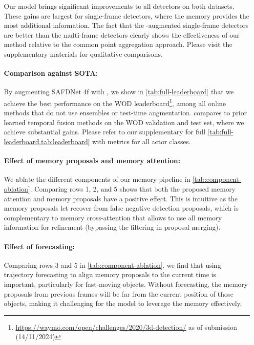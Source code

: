 Our model brings significant improvements to all detectors on both datasets.
These gains are largest for single-frame detectors, where the memory provides the most additional information.
The fact that the \ourmodel{}-augmented single-frame detectors are better than the multi-frame detectors clearly shows the effectiveness of our method relative to the common point aggregation approach.
Please visit the supplementary materials for qualitative comparisons.

\paragraph{Comparison against SOTA:}
By augmenting SAFDNet 4f with \ourmodel{},
we show in \cref{tab:full-leaderboard} that we achieve the best performance on the WOD leaderboard\footnote{\label{wod_leaderboard2}\href{https://waymo.com/open/challenges/2020/3d-detection/}{https://waymo.com/open/challenges/2020/3d-detection/} as of submission (14/11/2024)}, among all online methods that do not use ensembles or test-time augmentation.
 compares \ourmodel{}
to prior learned temporal fusion methods on
the WOD validation and test set, where we achieve substantial gains.
Please refer to our supplementary for full \cref{tab:full-leaderboard,tab:leaderboard} with metrics for all actor classes.


\paragraph{Effect of memory proposals and memory attention:}
We ablate the different components of our memory pipeline in \cref{tab:component-ablation}.
Comparing rows 1, 2, and 5 shows that both the proposed memory attention and memory proposals have a positive effect.
This is intuitive as the memory proposals let \ourmodel{} recover from false negative detection proposals, which is complementary to memory cross-attention that allows \ourmodel{} to use all memory information for refinement (bypassing the filtering in proposal-merging). 

\paragraph{Effect of forecasting:}
Comparing rows 3 and 5 in \cref{tab:component-ablation}, we find that using trajectory forecasting to align memory proposals to the current time is important, particularly for fast-moving objects.
Without forecasting, the memory proposals from previous frames
will be far from the current position of those objects, making it challenging for the model to leverage the memory effectively.

